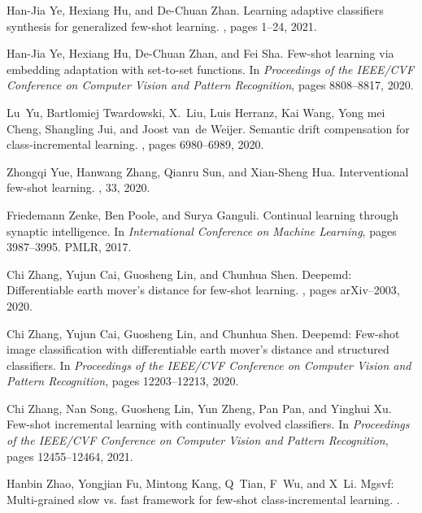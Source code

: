 \documentclass{article}
\begin{document}
\begin{thebibliography}{10}
Han-Jia Ye, Hexiang Hu, and De-Chuan Zhan.
\newblock Learning adaptive classifiers synthesis for generalized few-shot
  learning.
, pages 1--24, 2021.

Han-Jia Ye, Hexiang Hu, De-Chuan Zhan, and Fei Sha.
\newblock Few-shot learning via embedding adaptation with set-to-set functions.
\newblock In {\em Proceedings of the IEEE/CVF Conference on Computer Vision and
  Pattern Recognition}, pages 8808--8817, 2020.

Lu~Yu, Bartlomiej Twardowski, X.~Liu, Luis Herranz, Kai Wang, Yong mei Cheng,
  Shangling Jui, and Joost van~de Weijer.
\newblock Semantic drift compensation for class-incremental learning.
, pages 6980--6989, 2020.

Zhongqi Yue, Hanwang Zhang, Qianru Sun, and Xian-Sheng Hua.
\newblock Interventional few-shot learning.
, 33, 2020.

Friedemann Zenke, Ben Poole, and Surya Ganguli.
\newblock Continual learning through synaptic intelligence.
\newblock In {\em International Conference on Machine Learning}, pages
  3987--3995. PMLR, 2017.

Chi Zhang, Yujun Cai, Guosheng Lin, and Chunhua Shen.
\newblock Deepemd: Differentiable earth mover's distance for few-shot learning.
, pages arXiv--2003, 2020.

Chi Zhang, Yujun Cai, Guosheng Lin, and Chunhua Shen.
\newblock Deepemd: Few-shot image classification with differentiable earth
  mover's distance and structured classifiers.
\newblock In {\em Proceedings of the IEEE/CVF Conference on Computer Vision and
  Pattern Recognition}, pages 12203--12213, 2020.

Chi Zhang, Nan Song, Guosheng Lin, Yun Zheng, Pan Pan, and Yinghui Xu.
\newblock Few-shot incremental learning with continually evolved classifiers.
\newblock In {\em Proceedings of the IEEE/CVF Conference on Computer Vision and
  Pattern Recognition}, pages 12455--12464, 2021.

Hanbin Zhao, Yongjian Fu, Mintong Kang, Q~Tian, F~Wu, and X~Li.
\newblock Mgsvf: Multi-grained slow vs. fast framework for few-shot
  class-incremental learning.
.

\end{thebibliography}
\end{document}
